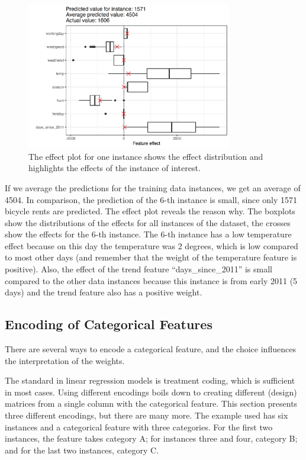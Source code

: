 \documentclass[
  11pt,
]{scrbook}
\begin{document}
\begin{figure}

{\centering \includegraphics[width=0.8\textwidth]{images/linear-effects-single-1} 

}

\caption{The effect plot for one instance shows the effect distribution and highlights the effects of the instance of interest.}\label{fig:linear-effects-single}
\end{figure}

If we average the predictions for the training data instances, we get an average of 4504.
In comparison, the prediction of the 6-th instance is small, since only 1571 bicycle rents are predicted.
The effect plot reveals the reason why.
The boxplots show the distributions of the effects for all instances of the dataset, the crosses show the effects for the 6-th instance.
The 6-th instance has a low temperature effect because on this day the temperature was 2 degrees, which is low compared to most other days (and remember that the weight of the temperature feature is positive).
Also, the effect of the trend feature ``days\_since\_2011'' is small compared to the other data instances because this instance is from early 2011 (5 days) and the trend feature also has a positive weight.

\hypertarget{cat-code}{%
\subsection{Encoding of Categorical Features}\label{cat-code}}

There are several ways to encode a categorical feature, and the choice influences the interpretation of the weights.

The standard in linear regression models is treatment coding, which is sufficient in most cases.
Using different encodings boils down to creating different (design) matrices from a single column with the categorical feature.
This section presents three different encodings, but there are many more.
The example used has six instances and a categorical feature with three categories.
For the first two instances, the feature takes category A;
for instances three and four, category B;
and for the last two instances, category C.
\end{document}
